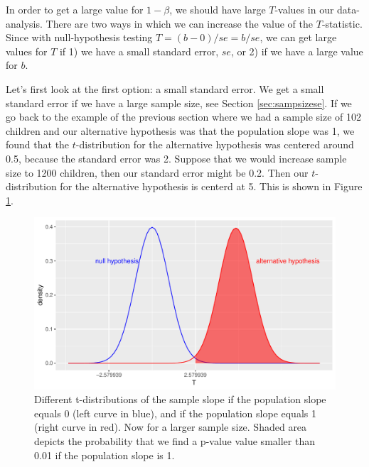 \documentclass[]{book}\usepackage[]{graphicx}\usepackage[]{color}
\makeatletter
\def\maxwidth{ %
  \ifdim\Gin@nat@width>\linewidth
    \linewidth
  \else
    \Gin@nat@width
  \fi
}
\newenvironment{knitrout}{}{} %
\makeatother
\begin{document}
In order to get a large value for $1-\beta$, we should have large $T$-values in our data-analysis. There are two ways in which we can increase the value of the $T$-statistic. Since with null-hypothesis testing $T=(b-0)/se=b/se$, we can get large values for $T$ if 1) we have a small standard error, $se$, or 2) if we have a large value for $b$. 


Let's first look at the first option: a small standard error. We get a small standard error if we have a large sample size, see Section \ref{sec:sampsizese}. If we go back to the example of the previous section where we had a sample size of 102 children and our alternative hypothesis was that the population slope was 1, we found that the $t$-distribution for the alternative hypothesis was centered around 0.5, because the standard error was 2. Suppose that we would increase sample size to 1200 children, then our standard error might be 0.2. Then our $t$-distribution for the alternative hypothesis is centerd at 5. This is shown in Figure \ref{fig:inf_24}.




\begin{knitrout}
\color{fgcolor}\begin{figure}

{\centering \includegraphics[width=\maxwidth]{figure/inf_24-1} 

}

\caption[Different t-distributions of the sample slope if the population slope equals 0 (left curve in blue), and if the population slope equals 1 (right curve in red)]{Different t-distributions of the sample slope if the population slope equals 0 (left curve in blue), and if the population slope equals 1 (right curve in red). Now for a larger sample size. Shaded area depicts the probability that we find a p-value value smaller than 0.01 if the population slope is 1.}\label{fig:inf_24}
\end{figure}


\end{knitrout}
\end{document}
